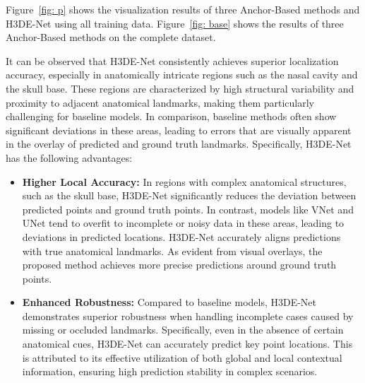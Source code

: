 Figure~\ref{fig: p} shows the visualization results of three Anchor-Based methods and H3DE-Net using all training data. Figure~\ref{fig: base} shows the results of three Anchor-Based methods on the complete dataset.

It can be observed that H3DE-Net consistently achieves superior localization accuracy, especially in anatomically intricate regions such as the nasal cavity and the skull base. These regions are characterized by high structural variability and proximity to adjacent anatomical landmarks, making them particularly challenging for baseline models. In comparison, baseline methods often show significant deviations in these areas, leading to errors that are visually apparent in the overlay of predicted and ground truth landmarks. Specifically, H3DE-Net has the following advantages:

\begin{itemize}
    \item \textbf{Higher Local Accuracy:} In regions with complex anatomical structures, such as the skull base, H3DE-Net significantly reduces the deviation between predicted points and ground truth points. In contrast, models like VNet and UNet tend to overfit to incomplete or noisy data in these areas, leading to deviations in predicted locations. H3DE-Net accurately aligns predictions with true anatomical landmarks. As evident from visual overlays, the proposed method achieves more precise predictions around ground truth points.
    
    \item \textbf{Enhanced Robustness:} Compared to baseline models, H3DE-Net demonstrates superior robustness when handling incomplete cases caused by missing or occluded landmarks. Specifically, even in the absence of certain anatomical cues, H3DE-Net can accurately predict key point locations. This is attributed to its effective utilization of both global and local contextual information, ensuring high prediction stability in complex scenarios.
\end{itemize}







